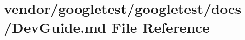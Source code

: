 \hypertarget{googletest_2docs_2DevGuide_8md}{}\section{vendor/googletest/googletest/docs/\+Dev\+Guide.md File Reference}
\label{googletest_2docs_2DevGuide_8md}
